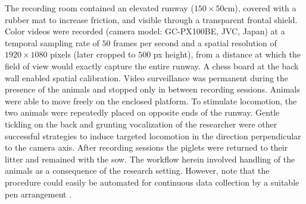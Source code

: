 The recording room contained an elevated runway (\(150 \times 50\)cm), covered with a rubber mat to increase friction, and visible through a transparent frontal shield.
Color videos were recorded (camera model: GC-PX100BE, JVC, Japan) at a temporal sampling rate of \(50\) frames per second and a spatial resolution of \(1920 \times 1080\) pixels (later cropped to \(500\) px height), from a distance at which the field of view would exactly capture the entire runway.
A chess board at the back wall enabled spatial calibration.
Video surveillance was permanent during the presence of the animals and stopped only in between recording sessions.
Animals were able to move freely on the enclosed platform.
To stimulate locomotion, the two animals were repeatedly placed on opposite ends of the runway.
Gentle tickling on the back and grunting vocalization of the researcher were other successful strategies to induce targeted locomotion in the direction perpendicular to the camera axis.
After recording sessions the piglets were returned to their litter and remained with the sow.
The workflow herein involved handling of the animals as a consequence of the research setting.
However, note that the procedure could easily be automated for continuous data collection by a suitable pen arrangement \citep{Meijer2014,Stavrakakis2014,Netukova2021}.



